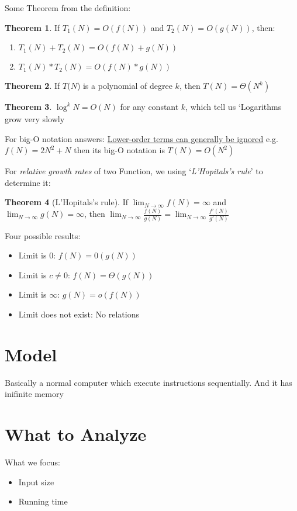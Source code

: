 \documentclass[12pt]{article}
\theoremstyle{definition}
\newtheorem{theorem}{Theorem}[section]
\begin{document}
Some Theorem from the definition:
\begin{theorem}
    If $T_1(N) = O(f(N))$ and $T_2(N) = O(g(N))$, then:
    \begin{enumerate}
        \item $T_1(N) + T_2(N) = O(f(N) + g(N))$
        \item $T_1(N) * T_2(N) = O(f(N) * g(N))$
    \end{enumerate}
\end{theorem}

\begin{theorem}
    If $T(N$) is a polynomial of degree $k$, then $T(N) = \Theta(N^k)$
\end{theorem}

\begin{theorem}
    $\log^k_{}N = O(N)$ for any constant $k$, which tell us `Logarithms grow very slowly
\end{theorem}

For big-O notation answers: \underline{Lower-order terms can generally be ignored}
e.g. $f(N) = 2N^2 + N$ then its big-O notation is $T(N) = O(N^2)$

For \emph{relative growth rates} of two Function, we using `\emph{L'Hopitals's rule}' to determine it:
\begin{theorem}[L'Hopitals's rule]
    If $\lim_{N\to\infty}f(N) = \infty$ and $\lim_{N\to\infty}g(N) = \infty$, 
    then $\lim_{N\to\infty} \frac{f(N)}{g(N)} = \lim_{N\to\infty} \frac{f'(N)}{g'(N)}$
\end{theorem} 

Four possible results:
\begin{itemize}
    \item Limit is 0: $f(N) = 0(g(N))$
    \item Limit is $c\neq 0$: $f(N) = \Theta(g(N))$
    \item Limit is $\infty$: $g(N) = o(f(N))$
    \item Limit does not exist: No relations
\end{itemize}

\section{Model}
Basically a normal computer which execute instructions sequentially. And it has inifinite memory

\section{What to Analyze}
What we focus:
\begin{itemize}
    \item Input size
    \item Running time
\end{itemize}
\end{document}
